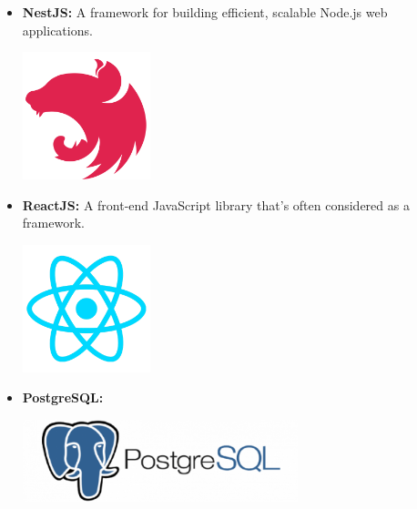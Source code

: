 \begin{itemize}
          \newpage
    \item \textbf{NestJS:} \newline \cite{nestjs} A framework for building efficient, scalable Node.js web applications. \newline
          \begin{minipage}{\linewidth}
              \centering
              \includegraphics[width=3.7cm]{src/assets/logos/nestjs_512x512.png}
          \end{minipage}
    \item \textbf{ReactJS:} \newline A front-end JavaScript library that's often considered as a framework. \newline
          \begin{minipage}{\linewidth}
              \centering
              \includegraphics[width=3.7cm]{src/assets/logos/react_512x512.png}
          \end{minipage}
    \item \textbf{PostgreSQL:} \newline \newline
          \begin{minipage}{\linewidth}
              \centering
              \includegraphics[width=8cm]{src/assets/logos/postgresql.png}
          \end{minipage}


\end{itemize}
